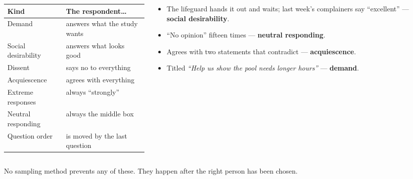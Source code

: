 \documentclass[aspectratio=169, 11pt]{beamer}
\newcommand{\redink}[1]{{\color{redacc}\bfseries #1}}
\begin{document}
\begin{frame}[t, plain]
  \vspace{2pt}
  \begin{columns}[t]
    \begin{column}{0.5\textwidth}
      \footnotesize
      \setlength{\tabcolsep}{4pt}
      \renewcommand{\arraystretch}{1.2}
      \begin{tabular}{@{} l l @{}}
      \hline
      \textbf{Kind} & \textbf{The respondent\ldots} \\
      \hline
      Demand & answers what the study wants \\
      Social desirability & answers what looks good \\
      Dissent & says no to everything \\
      Acquiescence & agrees with everything \\
      Extreme responses & always ``strongly'' \\
      Neutral responding & always the middle box \\
      Question order & is moved by the last question \\
      \hline
      \end{tabular}
    \end{column}
    \begin{column}{0.46\textwidth}
      \begin{itemize}\setlength{\itemsep}{5pt}
        \item The lifeguard hands it out and waits; last week's complainers say ``excellent'' ---
              \redink{social desirability}.
        \item ``No opinion'' fifteen times --- \redink{neutral responding}.
        \item Agrees with two statements that contradict --- \redink{acquiescence}.
        \item Titled \emph{``Help us show the pool needs longer hours''} --- \redink{demand}.
      \end{itemize}
    \end{column}
  \end{columns}
  \vspace{6pt}
  \begin{center}
    {\small\color{slate} No sampling method prevents any of these. They happen after the right
    person has been chosen.}
  \end{center}
\end{frame}
\end{document}
